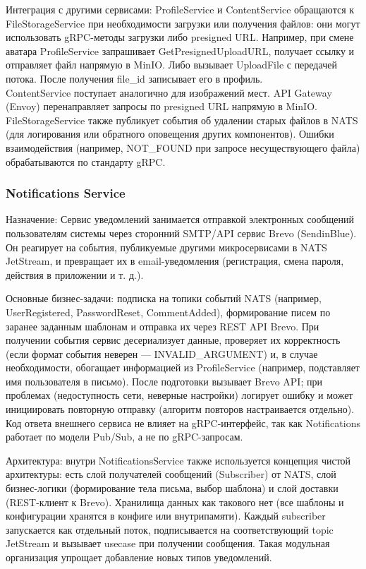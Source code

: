Интеграция с другими сервисами: ProfileService и ContentService обращаются к FileStorageService при необходимости загрузки или получения файлов: они могут использовать gRPC-методы загрузки либо presigned URL. Например, при смене аватара ProfileService запрашивает GetPresignedUploadURL, получает ссылку и отправляет файл напрямую в MinIO. Либо вызывает UploadFile с передачей потока. После получения file\_id записывает его в профиль. \\ ContentService поступает аналогично для изображений мест. API Gateway (Envoy) перенаправляет запросы по presigned URL напрямую в MinIO. FileStorageService также публикует события об удалении старых файлов в NATS (для логирования или обратного оповещения других компонентов). Ошибки взаимодействия (например, NOT\_FOUND при запросе несуществующего файла) обрабатываются по стандарту gRPC.

\subsubsection*{Notifications Service}
Назначение: Сервис уведомлений занимается отправкой электронных сообщений пользователям системы через сторонний SMTP/API сервис Brevo (SendinBlue). Он реагирует на события, публикуемые другими микросервисами в NATS JetStream, и превращает их в email-уведомления (регистрация, смена пароля, действия в приложении и т. д.).

Основные бизнес-задачи: подписка на топики событий NATS (например, UserRegistered, PasswordReset, CommentAdded), формирование писем по заранее заданным шаблонам и отправка их через REST API Brevo. При получении события сервис десериализует данные, проверяет их корректность (если формат события неверен — INVALID\_ARGUMENT) и, в случае необходимости, обогащает информацией из ProfileService (например, подставляет имя пользователя в письмо). После подготовки вызывает Brevo API; при проблемах (недоступность сети, неверные настройки) логирует ошибку и может инициировать повторную отправку (алгоритм повторов настраивается отдельно). Код ответа внешнего сервиса не влияет на gRPC-интерфейс, так как Notifications работает по модели Pub/Sub, а не по gRPC-запросам.

Архитектура: внутри NotificationsService также используется концепция чистой архитектуры: есть слой получателей сообщений (Subscriber) от NATS, слой бизнес-логики (формирование тела письма, выбор шаблона) и слой доставки (REST-клиент к Brevo). Хранилища данных как такового нет (все шаблоны и конфигурации хранятся в конфиге или внутрипамяти). Каждый subscriber запускается как отдельный поток, подписывается на соответствующий topic JetStream и вызывает usecase при получении сообщения. Такая модульная организация упрощает добавление новых типов уведомлений.

